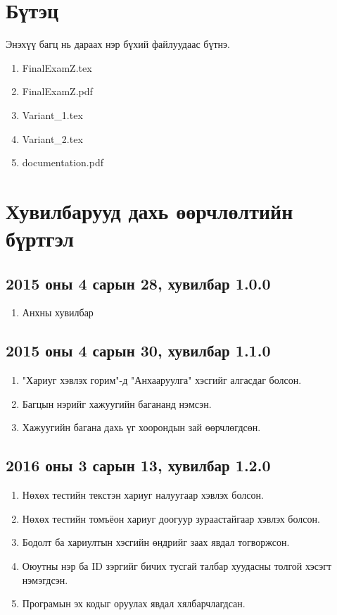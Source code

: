 \documentclass[10pt]{article}
\theoremstyle{definition}
\begin{document}
\section{Бүтэц}

Энэхүү багц нь дараах нэр бүхий файлуудаас бүтнэ.
\begin{enumerate}
 \item FinalExamZ.tex
 \item FinalExamZ.pdf
 \item Variant\_1.tex
 \item Variant\_2.tex
 \item documentation.pdf
\end{enumerate}

\section{Хувилбарууд дахь өөрчлөлтийн бүртгэл}

\subsection{2015 оны 4 сарын 28, хувилбар 1.0.0}

\begin{enumerate}
 \item Анхны хувилбар
\end{enumerate}

\subsection{2015 оны 4 сарын 30, хувилбар 1.1.0}

\begin{enumerate}
 \item "Хариуг хэвлэх горим"{}-д "Анхааруулга" хэсгийг алгасдаг болсон.
 \item Багцын нэрийг хажуугийн багананд нэмсэн.
 \item Хажуугийн багана дахь үг хоорондын зай өөрчлөгдсөн.
\end{enumerate}

\subsection{2016 оны 3 сарын 13, хувилбар 1.2.0}

\begin{enumerate}
 \item Нөхөх тестийн текстэн хариуг налуугаар хэвлэх болсон.
 \item Нөхөх тестийн томъёон хариуг доогуур зураастайгаар хэвлэх болсон.
 \item Бодолт ба хариултын хэсгийн өндрийг заах явдал тогворжсон.
 \item Оюутны нэр ба ID зэргийг бичих тусгай талбар хуудасны толгой хэсэгт нэмэгдсэн.
 \item Програмын эх кодыг оруулах явдал хялбарчлагдсан.
\end{enumerate}
\end{document}
